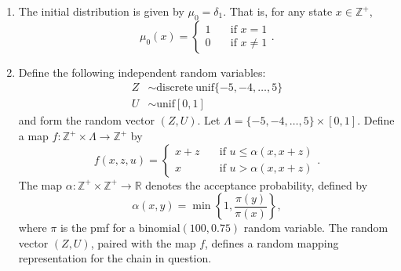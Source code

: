 \documentclass[12pt]{article}
\begin{document}
\begin{enumerate}
\item
The initial distribution is given by $\mu_0 = \delta_1$. That is, for any state $x \in \mathbb{Z}^+$,
\begin{equation*}
\mu_0(x) = \begin{cases}
1 &\quad \text{if $x = 1$} \\
0 &\quad \text{if $x \neq 1$}
\end{cases}.
\end{equation*}

\item
Define the following independent random variables:
\begin{align*}
Z &\sim \mathrm{discrete\ unif}\{-5, -4, \ldots, 5\} \\
U & \sim \mathrm{unif} [0, 1]
\end{align*}
and form the random vector $(Z, U)$. Let $\Lambda = \{-5, -4, \ldots, 5\} \times [0, 1]$. Define a map ${f : \mathbb{Z}^+ \times \Lambda \to \mathbb{Z}^+}$ by
\begin{equation*}
f(x, z, u) = \begin{cases}
x + z &\quad \text{if $u \leq \alpha(x, x+z)$} \\
x &\quad \text{if $u > \alpha(x, x+z)$}
\end{cases}.
\end{equation*}
The map $\alpha : \mathbb{Z}^+ \times \mathbb{Z}^+ \to \mathbb{R}$ denotes the acceptance probability, defined by
\begin{equation*}
\alpha(x, y) = \min\left\{1, \frac{\pi(y)}{\pi(x)} \right\},
\end{equation*}
where $\pi$ is the pmf for a $\mathrm{binomial(100, 0.75)}$ random variable. The random vector $(Z, U)$, paired with the map $f$, defines a random mapping representation for the chain in question.


\end{enumerate}
\end{document}
